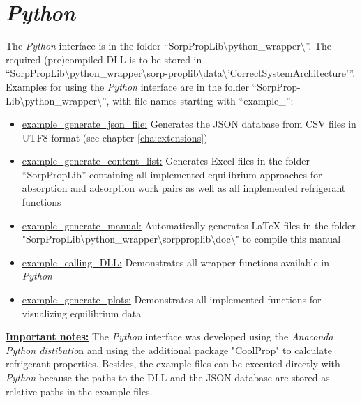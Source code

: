 \section{\textit{Python}}
\label{cha:usage:python}
%
The \textit{Python} interface is in the folder “SorpPropLib\textbackslash python\_wrapper\textbackslash ”. The required (pre)compiled DLL is to be stored in “SorpPropLib\textbackslash python\_wrapper\textbackslash sorp-proplib\textbackslash data\textbackslash 'CorrectSystemArchitecture'”. Examples for using the \textit{Python} interface are in the folder “SorpProp-Lib\textbackslash python\_wrapper\textbackslash ”, with file names starting with “example\_”:
\begin{itemize}
	\item \underline{example\_generate\_json\_file:} Generates the JSON database from CSV files in UTF8 format (see chapter \ref{cha:extensions})
	\item \underline{example\_generate\_content\_list:} Generates Excel files in the folder “SorpPropLib” containing all implemented equilibrium approaches for absorption and adsorption work pairs as well as all implemented refrigerant functions
	\item \underline{example\_generate\_manual:} Automatically generates LaTeX files in the folder "SorpPropLib\textbackslash python\_wrapper\textbackslash sorpproplib\textbackslash doc\textbackslash " to compile this manual
	\item \underline{example\_calling\_DLL:} Demonstrates all wrapper functions available in \textit{Python}
	\item \underline{example\_generate\_plots:} Demonstrates all implemented functions for visualizing equilibrium data
\end{itemize}
\textbf{\underline{Important notes:}} The \textit{Python} interface was developed using the \textit{Anaconda Python distibutio}n and using the additional package "CoolProp" to calculate refrigerant properties. Besides, the example files can be executed directly with \textit{Python} because the paths to the DLL and the JSON database are stored as relative paths in the example files.
